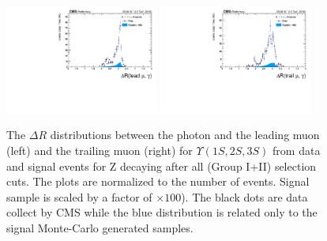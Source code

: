 \begin{figure}[!htbp]
\begin{center}
\includegraphics[width=0.45\textwidth]{figures_and_tables/outputPlots/ZtoUpsilon_Cat0_ZZZZZ/nEvts/data_x_mc/withKinCuts/h_withKin_deltaR_Leading_Photon}\hspace*{1.cm}
\includegraphics[width=0.45\textwidth]{figures_and_tables/outputPlots/ZtoUpsilon_Cat0_ZZZZZ/nEvts/data_x_mc/withKinCuts/h_withKin_deltaR_Trailing_Photon}\end{center}\vspace*{-.5cm}
\caption{The $\Delta R$ distributions between the photon and the leading muon (left) and the trailing muon (right) for $\Upsilon(1S,2S,3S)$ from data and signal events for Z decaying after all (Group I+II) selection cuts. The plots are normalized to the number of events. Signal sample is scaled by a factor of $\times 100$). The black dots are data collect by CMS while the blue distribution is related only to the signal Monte-Carlo generated samples.}
\label{fig:deltaR_ZtoUpsilon_Cat0_groupI_plus_II}
\end{figure}



